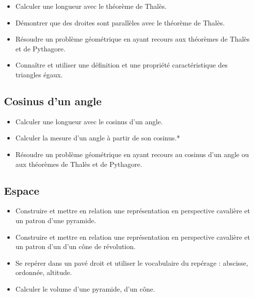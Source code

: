 \documentclass[a4paper,12pt,fleqn]{article}	
\begin{document}
\begin{itemize}
	\item {}Calculer une longueur avec le théorème de Thalès.
	\item {}Démontrer que des droites sont parallèles avec le théorème de Thalès.
	\item {}Résoudre un problème géométrique en ayant recours aux théorèmes de Thalès et de Pythagore.
	\item {}Connaître et utiliser une définition et une propriété caractéristique des triangles égaux.
\end{itemize}

\subsection*{Cosinus d'un angle}

\begin{itemize}
	\item {}Calculer une longueur avec le cosinus d'un angle.
	\item {}Calculer la mesure d’un angle à partir de son cosinus.*
	\item {}Résoudre un problème géométrique en ayant recours au cosinus d'un angle ou aux théorèmes de Thalès et de Pythagore.
\end{itemize}

\subsection*{Espace}

\begin{itemize}
	\item {}Construire et mettre en relation une représentation en perspective cavalière et un patron d’une pyramide.
	\item {}Construire et mettre en relation une représentation en perspective cavalière et un patron d’un d’un cône de révolution.
	\item {}Se repérer dans un pavé droit et utiliser le vocabulaire du repérage : abscisse, ordonnée, altitude.
	\item {}Calculer le volume d’une pyramide, d’un cône.
\end{itemize}
	
\end{document}
